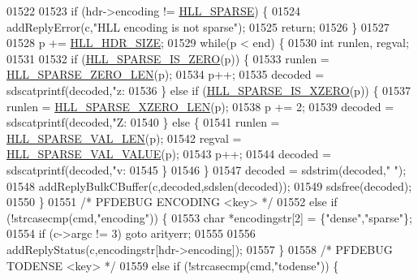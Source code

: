 \begin{DoxyCode}
{{{{01522 
01523         \textcolor{keywordflow}{if} (hdr->encoding != \hyperlink{hyperloglog_8c_afe326d57dd3d7c27c8fe52dc2c19cecd}{HLL\_SPARSE}) \{
01524             addReplyError(c,\textcolor{stringliteral}{"HLL encoding is not sparse"});
01525             \textcolor{keywordflow}{return};
01526         \}
01527 
01528         p += \hyperlink{hyperloglog_8c_af04dc163054c4c79b0e6c93057b4032f}{HLL\_HDR\_SIZE};
01529         \textcolor{keywordflow}{while}(p < end) \{
01530             \textcolor{keywordtype}{int} runlen, regval;
01531 
01532             \textcolor{keywordflow}{if} (\hyperlink{hyperloglog_8c_a0b65ae2290df116ae4ed18188dffb5ad}{HLL\_SPARSE\_IS\_ZERO}(p)) \{
01533                 runlen = \hyperlink{hyperloglog_8c_a0ed89a76f49a89991af87cce34c3260b}{HLL\_SPARSE\_ZERO\_LEN}(p);
01534                 p++;
01535                 decoded = sdscatprintf(decoded,\textcolor{stringliteral}{"z:%
01536             \} \textcolor{keywordflow}{else} \textcolor{keywordflow}{if} (\hyperlink{hyperloglog_8c_ac672e0af491e4cbfe7a5859ae4dc74f9}{HLL\_SPARSE\_IS\_XZERO}(p)) \{
01537                 runlen = \hyperlink{hyperloglog_8c_a95fbeb27967ea46816fd354ddb59564e}{HLL\_SPARSE\_XZERO\_LEN}(p);
01538                 p += 2;
01539                 decoded = sdscatprintf(decoded,\textcolor{stringliteral}{"Z:%
01540             \} \textcolor{keywordflow}{else} \{
01541                 runlen = \hyperlink{hyperloglog_8c_a5c74b3b50c822c01c1976a72b84db12f}{HLL\_SPARSE\_VAL\_LEN}(p);
01542                 regval = \hyperlink{hyperloglog_8c_ad36de263468a9ce3b1409743b8da64d7}{HLL\_SPARSE\_VAL\_VALUE}(p);
01543                 p++;
01544                 decoded = sdscatprintf(decoded,\textcolor{stringliteral}{"v:%
01545             \}
01546         \}
01547         decoded = sdstrim(decoded,\textcolor{stringliteral}{" "});
01548         addReplyBulkCBuffer(c,decoded,sdslen(decoded));
01549         sdsfree(decoded);
01550     \}
01551     \textcolor{comment}{/* PFDEBUG ENCODING <key> */}
01552     \textcolor{keywordflow}{else} \textcolor{keywordflow}{if} (!strcasecmp(cmd,\textcolor{stringliteral}{"encoding"})) \{
01553         \textcolor{keywordtype}{char} *encodingstr[2] = \{\textcolor{stringliteral}{"dense"},\textcolor{stringliteral}{"sparse"}\};
01554         \textcolor{keywordflow}{if} (c->argc != 3) \textcolor{keywordflow}{goto} arityerr;
01555 
01556         addReplyStatus(c,encodingstr[hdr->encoding]);
01557     \}
01558     \textcolor{comment}{/* PFDEBUG TODENSE <key> */}
01559     \textcolor{keywordflow}{else} \textcolor{keywordflow}{if} (!strcasecmp(cmd,\textcolor{stringliteral}{"todense"})) \{
}}}}}}}
\end{DoxyCode}
